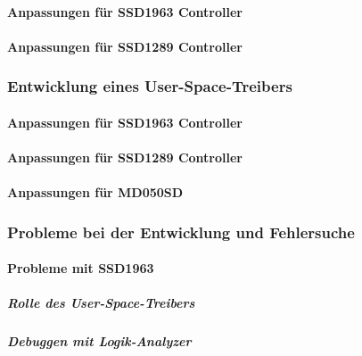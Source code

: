 \newpage
\paragraph{Anpassungen für SSD1963 Controller}
\paragraph{Anpassungen für SSD1289 Controller}

\subsubsection{Entwicklung eines User-Space-Treibers}
\paragraph{Anpassungen für SSD1963 Controller}
\paragraph{Anpassungen für SSD1289 Controller}
\paragraph{Anpassungen für MD050SD}
\subsubsection{Probleme bei der Entwicklung und Fehlersuche}
\paragraph{Probleme mit SSD1963}
\subparagraph{Rolle des User-Space-Treibers}
\subparagraph{Debuggen mit Logik-Analyzer}



